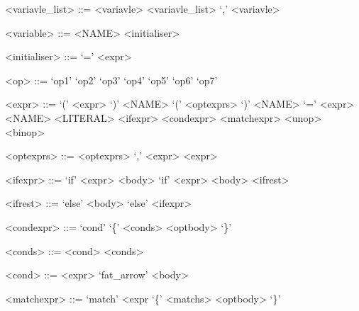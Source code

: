 \documentclass[12pt,a4paper]{article}
\begin{document}
\begin{grammar}
<variavle_list> ::= <variavle>
	\alt <variavle_list> `,' <variavle>
\end{grammar}

\begin{grammar}
<variable> ::= <NAME> <initialiser> 
\end{grammar}

\begin{grammar}
<initialiser> ::= `=' <expr>
	\alt \epsilon
\end{grammar}

\begin{grammar}
<op> ::= `op1'
	\alt `op2'
	\alt `op3'
	\alt `op4'
	\alt `op5'
	\alt `op6'
	\alt `op7'
\end{grammar}

\begin{grammar}
<expr> ::= `(' <expr> `)'
	\alt <NAME> `(' <optexprs> `)'
	\alt <NAME> `=' <expr>
	\alt <NAME> 
	\alt <LITERAL>
	\alt <ifexpr>
	\alt <condexpr>
	\alt <matchexpr>
	\alt <unop>
	\alt <binop>
\end{grammar}

\begin{grammar}
<optexprs> ::= <optexprs> `,' <expr>
	\alt <expr>
	\alt \epsilon
\end{grammar}

\begin{grammar}
<ifexpr> ::= `if' <expr> <body>
	\alt `if' <expr> <body> <ifrest>
\end{grammar}

\begin{grammar}
<ifrest> ::= `else' <body>
	\alt `else' <ifexpr>
\end{grammar}

\begin{grammar}
<condexpr> ::= `cond' `\{' <conds> <optbody> `\}' 
\end{grammar}

\begin{grammar}
<conds> ::= <cond> <conds>
	\alt \epsilon
\end{grammar}

\begin{grammar}
<cond> ::= <expr> `fat_arrow' <body> 
\end{grammar}

\begin{grammar}
<matchexpr> ::= `match' <expr `\{' <matchs> <optbody> `\}' 
\end{grammar}
\end{document}
